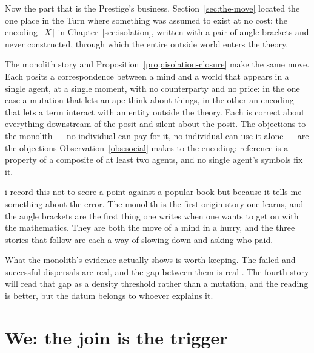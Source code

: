 Now the part that is the Prestige's business. Section~\ref{sec:the-move} located the one place in the Turn where something was assumed to exist at no cost: the encoding $\lceil X \rceil$ in Chapter~\ref{sec:isolation}, written with a pair of angle brackets and never constructed, through which the entire outside world enters the theory.

\begin{observation}
\label{st:obs:monolith}
The monolith story and Proposition~\ref{prop:isolation-closure} make the same move. Each posits a correspondence between a mind and a world that appears in a single agent, at a single moment, with no counterparty and no price: in the one case a mutation that lets an ape think about things, in the other an encoding that lets a term interact with an entity outside the theory. Each is correct about everything downstream of the posit and silent about the posit. The objections to the monolith --- no individual can pay for it, no individual can use it alone --- are the objections Observation~\ref{obs:social} makes to the encoding: reference is a property of a composite of at least two agents, and no single agent's symbols fix it.
\end{observation}

\noindent
i record this not to score a point against a popular book but because it tells me something about the error. The monolith is the first origin story one learns, and the angle brackets are the first thing one writes when one wants to get on with the mathematics. They are both the move of a mind in a hurry, and the three stories that follow are each a way of slowing down and asking who paid.

What the monolith's evidence actually shows is worth keeping. The failed and successful dispersals are real, and the gap between them is real \cite{hershkovitz2018,harvati2019}. The fourth story will read that gap as a density threshold rather than a mutation, and the reading is better, but the datum belongs to whoever explains it.

\section{We: the join is the trigger}
\label{st:sec:we}

